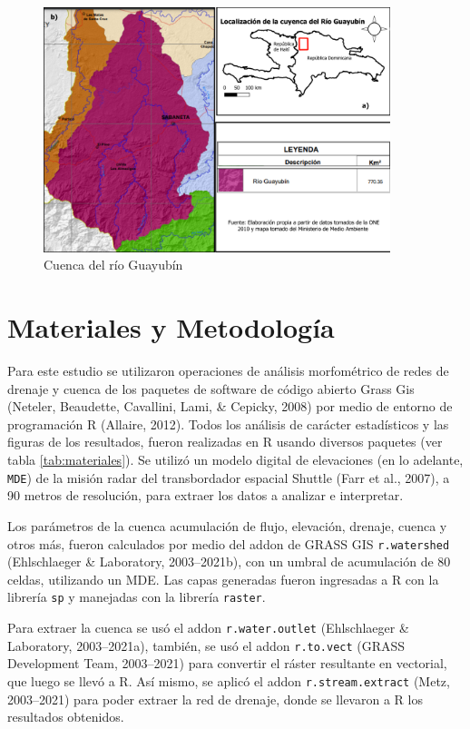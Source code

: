 \documentclass[11pt,]{article}
\begin{document}
\begin{figure}
\centering
\includegraphics[width=0.90000\textwidth]{Mapa final.png}
\caption{Cuenca del río Guayubín\label{mapacuenca}}
\end{figure}

\section{Materiales y Metodología}\label{materiales-y-metodologuxeda}

Para este estudio se utilizaron operaciones de análisis morfométrico de
redes de drenaje y cuenca de los paquetes de software de código abierto
Grass Gis (Neteler, Beaudette, Cavallini, Lami, \& Cepicky, 2008) por
medio de entorno de programación R (Allaire, 2012). Todos los análisis
de carácter estadísticos y las figuras de los resultados, fueron
realizadas en R usando diversos paquetes (ver tabla
\ref{tab:materiales}). Se utilizó un modelo digital de elevaciones (en
lo adelante, \texttt{MDE}) de la misión radar del transbordador espacial
Shuttle (Farr et al., 2007), a 90 metros de resolución, para extraer los
datos a analizar e interpretar.

Los parámetros de la cuenca acumulación de flujo, elevación, drenaje,
cuenca y otros más, fueron calculados por medio del addon de GRASS GIS
\texttt{r.watershed} (Ehlschlaeger \& Laboratory, 2003--2021b), con un
umbral de acumulación de 80 celdas, utilizando un MDE. Las capas
generadas fueron ingresadas a R con la librería \texttt{sp} y manejadas
con la librería \texttt{raster}.

Para extraer la cuenca se usó el addon \texttt{r.water.outlet}
(Ehlschlaeger \& Laboratory, 2003--2021a), también, se usó el addon
\texttt{r.to.vect} (GRASS Development Team, 2003--2021) para convertir
el ráster resultante en vectorial, que luego se llevó a R. Así mismo, se
aplicó el addon \texttt{r.stream.extract} (Metz, 2003--2021) para poder
extraer la red de drenaje, donde se llevaron a R los resultados
obtenidos.
\end{document}
